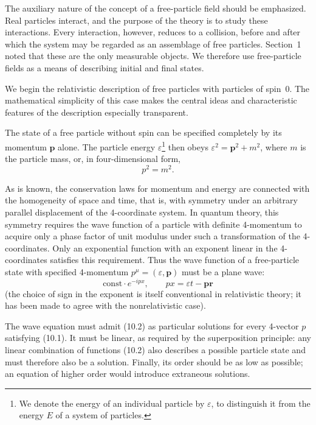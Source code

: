 The auxiliary nature of the concept of a free-particle field should be emphasized. Real particles interact, and the purpose of the theory is to study these interactions. Every interaction, however, reduces to a collision, before and after which the system may be regarded as an assemblage of free particles. Section~1 noted that these are the only measurable objects. We therefore use free-particle fields as a means of describing initial and final states.

We begin the relativistic description of free particles with particles of spin~0. The mathematical simplicity of this case makes the central ideas and characteristic features of the description especially transparent.

The state of a free particle without spin can be specified completely by its momentum $\mathbf{p}$ alone. The particle energy $\varepsilon$\footnote{We denote the energy of an individual particle by $\varepsilon$, to distinguish it from the energy $E$ of a system of particles.} then obeys $\varepsilon^2=\mathbf{p}^2+m^2$, where $m$ is the particle mass, or, in four-dimensional form,
\begin{equation}
p^2=m^2.
\tag{10.1}
\end{equation}

As is known, the conservation laws for momentum and energy are connected with the homogeneity of space and time, that is, with symmetry under an arbitrary parallel displacement of the 4-coordinate system. In quantum theory, this symmetry requires the wave function of a particle with definite 4-momentum to acquire only a phase factor of unit modulus under such a transformation of the 4-coordinates. Only an exponential function with an exponent linear in the 4-coordinates satisfies this requirement. Thus the wave function of a free-particle state with specified 4-momentum $p^\mu=(\varepsilon,\mathbf{p})$ must be a plane wave:
\begin{equation}
\mathrm{const}\cdot e^{-ipx},
\qquad
px=\varepsilon t-\mathbf{p}\mathbf{r}
\tag{10.2}
\end{equation}
(the choice of sign in the exponent is itself conventional in relativistic theory; it has been made to agree with the nonrelativistic case).

The wave equation must admit (10.2) as particular solutions for every 4-vector $p$ satisfying (10.1). It must be linear, as required by the superposition principle: any linear combination of functions (10.2) also describes a possible particle state and must therefore also be a solution. Finally, its order should be as low as possible; an equation of higher order would introduce extraneous solutions.


